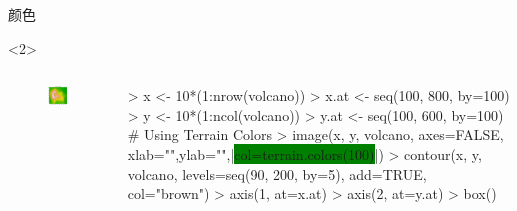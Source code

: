 \documentclass{beamerthemeMono}
\begin{document}
\begin{frame}[t,fragile]{\subsecname}{颜色}
\begin{overlayarea}{\textwidth}{\textheight}
\begin{onlyenv}<2>
  \begin{columns}
    \begin{column}{.4\textwidth}
\centering
\begin{figure}
  \includegraphics[width=\columnwidth]{terrain_colors.png}
\end{figure}
    \end{column}

    \begin{column}{.6\textwidth}
\centering
\begin{rcode}
> x <- 10*(1:nrow(volcano))
> x.at <- seq(100, 800, by=100)
> y <- 10*(1:ncol(volcano))
> y.at <- seq(100, 600, by=100)
# Using Terrain Colors 
> image(x, y, volcano, axes=FALSE, xlab="",ylab="",|\colorbox{green}{col=terrain.colors(100)}|)
> contour(x, y, volcano, levels=seq(90, 200, by=5), add=TRUE, col="brown")
> axis(1, at=x.at)
> axis(2, at=y.at)
> box()
\end{rcode}
    \end{column}
  \end{columns}
\end{onlyenv}


\end{overlayarea}
\end{frame}
\end{document}
